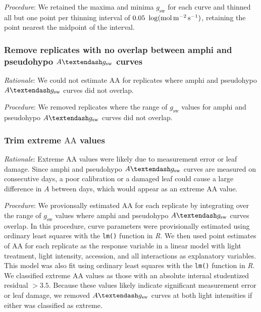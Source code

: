 \documentclass[
  letterpaper,
  DIV=11,
  numbers=noendperiod]{scrartcl}
\newcommand{\aax}{$\mathrm{AA}$}
\newcommand{\agcurve}{$A \textendash g_\text{sw}$}
\newcommand{\gsw}{$g_\text{sw}$}
\begin{document}
\emph{Procedure}: We retained the maxima and minima \gsw{} for each
curve and thinned all but one point per thinning interval of
\(0.05~\log(\si{\mol\raiseto{-2}\meter\raiseto{-1}\second})\), retaining
the point nearest the midpoint of the interval.

\subsubsection{\texorpdfstring{Remove replicates with no overlap between
amphi and pseudohypo \agcurve{}
curves}{Remove replicates with no overlap between amphi and pseudohypo  curves}}\label{remove-replicates-with-no-overlap-between-amphi-and-pseudohypo-curves}

\emph{Rationale}: We could not estimate \aax{} for replicates where
amphi and pseudohypo \agcurve{} curves did not overlap.

\emph{Procedure}: We removed replicates where the range of \gsw{} values
for amphi and pseudohypo \agcurve{} curves did not overlap.

\subsubsection{\texorpdfstring{Trim extreme \aax{}
values}{Trim extreme  values}}\label{trim-extreme-values}

\emph{Rationale}: Extreme \aax{} values were likely due to measurement
error or leaf damage. Since amphi and pseudohypo \agcurve{} curves are
measured on consecutive days, a poor calibration or a damaged leaf could
cause a large difference in \(A\) between days, which would appear as an
extreme \aax{} value.

\emph{Procedure}: We provionsally estimated \aax{} for each replicate by
integrating over the range of \gsw{} values where amphi and pseudohypo
\agcurve{} curves overlap. In this procedure, curve parameters were
provisionally estimated using ordinary least squares with the
\texttt{lm()} function in \emph{R}. We then used point estimates of
\aax{} for each replicate as the response variable in a linear model
with light treatment, light intensity, accession, and all interactions
as explanatory variables. This model was also fit using ordinary least
squares with the \texttt{lm()} function in \emph{R}. We classified
extreme \aax{} values as those with an absolute internal studentized
residual \(> 3.5\). Because these values likely indicate significant
measurement error or leaf damage, we removed \agcurve{} curves at both
light intensities if either was classified as extreme.
\end{document}
